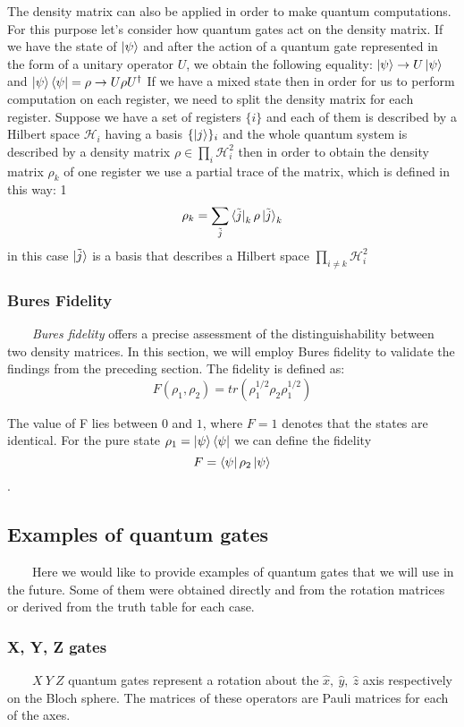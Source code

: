 \documentclass[english,14pt,a4paper]{article}
\begin{document}
\begin{spacing}{1.5}
	The density matrix can also be applied in order to make quantum computations. For this purpose let's consider how quantum gates act on the density matrix. If we have the state of $\ket{\psi}$ and after the action of a quantum gate represented in the form of a unitary operator $U$, we obtain the following equality: $\ket{\psi} \rightarrow U\ket{\psi}$ and $\ket{\psi}\bra{\psi} = \rho \rightarrow U\rho U^{\dag}$
	If we have a mixed state then in order for us to perform computation on each register, we need to split the density matrix for each register. 	
	Suppose we have a set of registers $\{i\}$ and each of them is described by a Hilbert space $\mathcal{H}_i$ having a basis $\{\ket{j}\}_i$ and the whole quantum system is described by a density matrix $\rho  \in \prod_i \mathcal{H}_i^2$ then in order to obtain the density matrix $\rho_k$ of one register we use a partial trace of the matrix, which is defined in this way:
1	\[
	\rho_k = \sum_{\tilde{j}} \bra{\tilde{j}}_k \rho \ket{\tilde{j}}_k
	\]  
	in this case $\ket{\tilde{j}}$ is a basis that describes a Hilbert space $\prod_{i \neq k} \mathcal{H}_i^2 $ 
	
	\subsubsection{Bures Fidelity} \ \ \ \
	\textit{Bures fidelity} offers a precise assessment of the distinguishability between two density matrices. In this section, we will employ Bures fidelity to validate the findings from the preceding section. The fidelity is defined as: 
	\begin{equation}
		F(\rho_1, \rho_2) = tr(\rho_1^{1/2}\rho_2\rho_1^{1/2})
	\end{equation}
	
	The value of F lies between $0$ and $1$, where $F = 1$ denotes that the states are identical. For the pure state $\rho_1 = \ket{\psi}\bra{\psi}$ we can define the fidelity \[F = \bra{\psi}\rho_2 \ket{\psi}\].
	
	\subsection{Examples of quantum gates} \ \ \ \ 
	Here we would like to provide examples of quantum gates that we will use in the future. Some of them were obtained directly and from the rotation matrices or derived from the truth table for each case. 
	
	\subsubsection{X, Y, Z gates}\ \ \ \
	\(X  \ Y \ Z\) quantum gates represent a rotation about the $\hat{x}, \ \hat{y}, \ \hat{z}$ axis respectively on the Bloch sphere. The matrices of these operators are Pauli matrices for each of the axes. 
	

\end{spacing}
\end{document}
